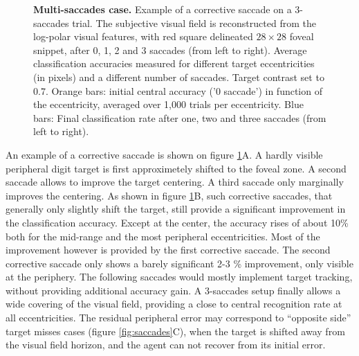 \begin{figure}[t!]%
	\caption{
		{\bf Multi-saccades case.} %
		\A Example of a corrective saccade on a 3-saccades trial. The subjective visual field  is reconstructed from the log-polar visual features, with red square delineated $28\times28$ foveal snippet, after 0, 1, 2 and 3 saccades (from left to right).
		\B Average classification accuracies measured for different target eccentricities (in pixels) and a different number of saccades. Target contrast set to 0.7. Orange bars: initial central accuracy ('0 saccade') in function of the eccentricity, averaged over 1,000 trials per eccentricity. Blue bars: Final classification rate after one, two and three saccades (from left to right). %
		\label{fig:results-saccades}}%
\end{figure}%

An example of a corrective saccade is shown on figure \ref{fig:results-saccades}A. A hardly visible peripheral digit target is first approximetely shifted to the foveal zone. A second saccade allows to improve the target centering. A third saccade only marginally improves the centering. 
As shown in figure  \ref{fig:results-saccades}B, such corrective saccades, that generally only slightly shift the target, still provide a significant improvement in the classification accuracy. Except at the center, the accuracy rises of about 10\% both for the mid-range and the most peripheral eccentricities. Most of the improvement however is provided by the first corrective saccade. The second corrective saccade only shows a barely significant 2-3 \% improvement, only visible at the periphery. The following saccades would mostly implement target tracking, without providing additional accuracy gain. A 3-saccades setup finally allows a wide covering of the visual field, providing a close to central  recognition rate at all eccentricities. The residual peripheral error may correspond to ``opposite side'' target misses cases (figure \ref{fig:saccades}C), when the target is shifted away from the visual field horizon, and the agent can not recover from its initial error.

